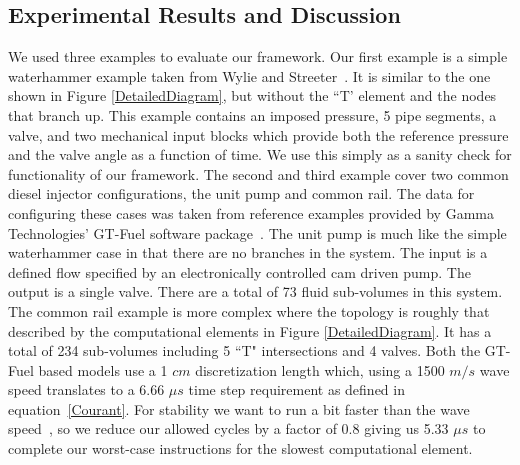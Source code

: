 \subsection {Experimental Results and Discussion}
\label{sec:results}
We used three examples to evaluate our framework.
Our first example is a simple waterhammer example taken from Wylie and Streeter~\cite{1978FluidTransients}.
It is similar to the one shown in Figure \ref{DetailedDiagram}, but without the ``T' element and the nodes that branch up.
This example contains an imposed pressure, 5 pipe segments, a valve, and two mechanical input blocks which provide both the reference pressure and the valve angle as a function of time.
We use this simply as a sanity check for functionality of our framework.  
The second and third example cover two common diesel injector configurations, the unit pump and common rail.  
The data for configuring these cases was taken from reference examples provided by Gamma Technologies' GT-Fuel software package~\cite{GTFuel}. 
The unit pump is much like the simple waterhammer case in that there are no branches in the system.  
The input is a defined flow specified by an electronically controlled cam driven pump.  
The output is a single valve.  
There are a total of 73 fluid sub-volumes in this system. 
The common rail example is more complex where the topology is roughly that described by the computational elements in Figure \ref{DetailedDiagram}.  
It has a total of 234 sub-volumes including 5 ``T" intersections and 4 valves.
Both the GT-Fuel based models use a 1 $cm$ discretization length which, using a 1500 $m/s$ wave speed translates to a 6.66 \(\mu s\) time step requirement as defined in equation~\ref{Courant}.  
For stability we want to run a bit faster than the wave speed~\cite{GTFuel}, so we reduce our allowed cycles by a factor of 0.8 giving us 5.33 \(\mu s\) to complete our worst-case instructions for the slowest computational element.


